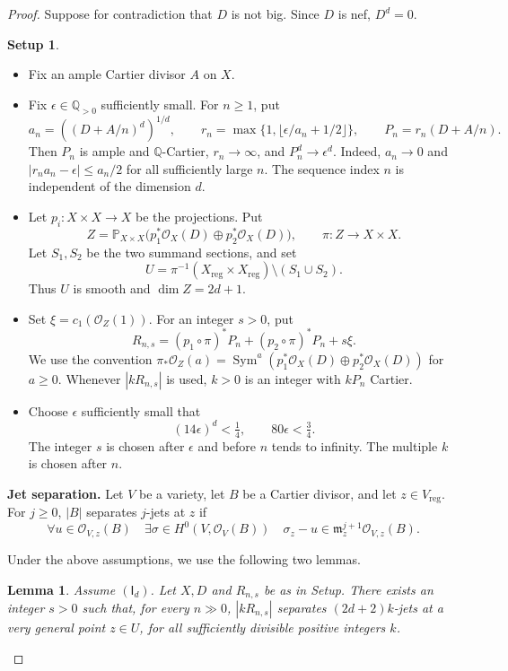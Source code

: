 \documentclass[12pt,a4paper,psamsfonts]{amsart}
\theoremstyle{definition}
\newtheorem*{setup}{Setup}
\theoremstyle{plain}
\newtheorem{lemma}{Lemma}[section]
\newcommand{\Q}{\mathbb Q}
\newcommand{\OO}{\mathcal O}
\newcommand{\PP}{\mathbb P}
\DeclareMathOperator{\Sym}{Sym}
\begin{document}
\begin{proof}
Suppose for contradiction that $D$ is not big. Since $D$ is
nef, $D^d=0$.

\begin{setup}
\leavevmode
\begin{itemize}
\setlength{\itemsep}{2pt}
\setlength{\parsep}{0pt}
\item Fix an ample Cartier divisor $A$ on $X$.
\item Fix $\epsilon\in\Q_{>0}$ sufficiently small. For $n\ge1$, put
\[
 a_n=((D+A/n)^d)^{1/d},\qquad
 r_n=\max\{1,\lfloor\epsilon/a_n+1/2\rfloor\},\qquad
 P_n=r_n(D+A/n).
\]
Then $P_n$ is ample and $\mathbb{Q}$-Cartier, $r_n\to\infty$, and
$P_n^d\to\epsilon^d$. Indeed, $a_n\to0$ and
$|r_na_n-\epsilon|\le a_n/2$ for all sufficiently large $n$.
The sequence index $n$ is independent of the dimension $d$.
\item Let $p_i:X\times X\to X$ be the projections. Put
\[
 Z=\PP_{X\times X}
       \bigl(p_1^*\OO_X(D)\oplus p_2^*\OO_X(D)\bigr),
 \qquad \pi:Z\to X\times X.
\]
Let $S_1,S_2$ be the two summand sections, and set
\[
 U=\pi^{-1}(X_{\mathrm{reg}}\times X_{\mathrm{reg}})
       \setminus(S_1\cup S_2).
\]
Thus $U$ is smooth and $\dim Z=2d+1$.
\item Set $\xi=c_1(\OO_Z(1))$. For an integer $s>0$, put
\[
 R_{n,s}=(p_1\circ\pi)^*P_n+(p_2\circ\pi)^*P_n+s\xi.
\]
We use the convention
$\pi_*\OO_Z(a)=\Sym^a(p_1^*\OO_X(D)\oplus p_2^*\OO_X(D))$
for $a\ge0$. Whenever $|kR_{n,s}|$ is used, $k>0$ is an integer
with $kP_n$ Cartier.
\item Choose $\epsilon$ sufficiently small that
\[
 (14\epsilon)^d<\tfrac14,\qquad80\epsilon<\tfrac34.
\]
The integer $s$ is chosen after $\epsilon$ and before $n$ tends
to infinity. The multiple $k$ is chosen after $n$.
\end{itemize}
\end{setup}

\medskip
\noindent\textbf{Jet separation.}
Let $V$ be a variety, let $B$ be a Cartier divisor, and let
$z\in V_{\mathrm{reg}}$. For $j\ge0$, $|B|$ separates $j$-jets
at $z$ if
\[
 \forall u\in\OO_{V,z}(B)\quad
 \exists\sigma\in H^0(V,\OO_V(B))\quad
 \sigma_z-u\in\mathfrak m_z^{j+1}\OO_{V,z}(B).
\]

Under the above assumptions, we use the following two lemmas.

\begin{lemma}\label{lem:general-jets}
Assume $(\mathsf I_d)$. Let $X,D$ and $R_{n,s}$ be as in Setup.
There exists an integer $s>0$ such that, for every $n\gg0$,
$|kR_{n,s}|$ separates $(2d+2)k$-jets at a very general point
$z\in U$, for all sufficiently divisible positive integers $k$.
\end{lemma}


\end{proof}
\end{document}
